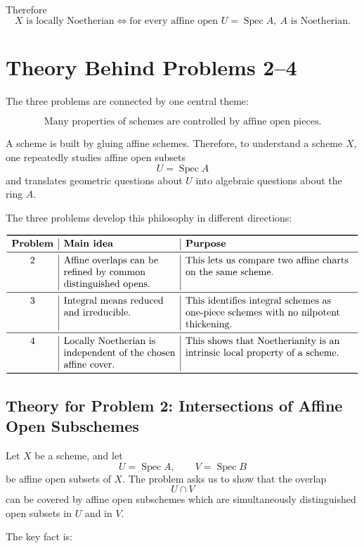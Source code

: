 \documentclass[12pt,a4paper]{article}
\DeclareMathOperator{\Spec}{Spec}
\providecommand{\Spec}{\operatorname{Spec}}
\theoremstyle{notespace}
\begin{document}
Therefore
\[
\boxed{
	X\text{ is locally Noetherian}
	\iff
	\text{for every affine open }U=\Spec A,\ A\text{ is Noetherian}.
}
\]

\section{Theory Behind Problems 2--4}

The three problems are connected by one central theme:

\[
\boxed{
	\text{Many properties of schemes are controlled by affine open pieces.}
}
\]

A scheme is built by gluing affine schemes. Therefore, to understand a scheme \(X\), one repeatedly studies affine open subsets
\[
U=\Spec A
\]
and translates geometric questions about \(U\) into algebraic questions about the ring \(A\).

The three problems develop this philosophy in different directions:

\[
\begin{array}{c|>{\raggedright\arraybackslash}p{4cm}|>{\raggedright\arraybackslash}p{6cm}}
	\toprule
	\textbf{Problem} & \textbf{Main idea} & \textbf{Purpose} \\
	\midrule
	2
	&
	Affine overlaps can be refined by common distinguished opens.
	&
	This lets us compare two affine charts on the same scheme.
	\\
	\midrule
	3
	&
	Integral means reduced and irreducible.
	&
	This identifies integral schemes as one-piece schemes with no nilpotent thickening.
	\\
	\midrule
	4
	&
	Locally Noetherian is independent of the chosen affine cover.
	&
	This shows that Noetherianity is an intrinsic local property of a scheme.
	\\
	\bottomrule
\end{array}
\]

\subsection{Theory for Problem 2: Intersections of Affine Open Subschemes}

Let \(X\) be a scheme, and let
\[
U=\Spec A,
\qquad
V=\Spec B
\]
be affine open subsets of \(X\). The problem asks us to show that the overlap
\[
U\cap V
\]
can be covered by affine open subschemes which are simultaneously distinguished open subsets in \(U\) and in \(V\).

The key fact is:
\end{document}
